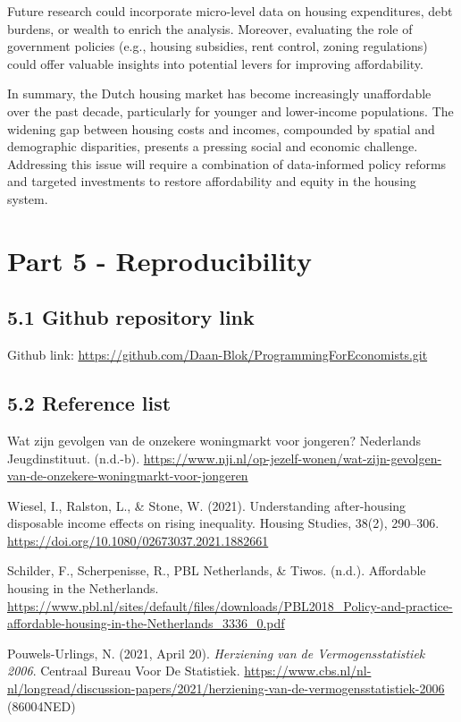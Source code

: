 \documentclass[
]{article}
\begin{document}
Future research could incorporate micro-level data on housing
expenditures, debt burdens, or wealth to enrich the analysis. Moreover,
evaluating the role of government policies (e.g., housing subsidies,
rent control, zoning regulations) could offer valuable insights into
potential levers for improving affordability.

In summary, the Dutch housing market has become increasingly
unaffordable over the past decade, particularly for younger and
lower-income populations. The widening gap between housing costs and
incomes, compounded by spatial and demographic disparities, presents a
pressing social and economic challenge. Addressing this issue will
require a combination of data-informed policy reforms and targeted
investments to restore affordability and equity in the housing system.

\section{Part 5 - Reproducibility}\label{part-5---reproducibility}

\subsection{5.1 Github repository link}\label{github-repository-link}

Github link:
\url{https://github.com/Daan-Blok/ProgrammingForEconomists.git}

\subsection{5.2 Reference list}\label{reference-list}

Wat zijn gevolgen van de onzekere woningmarkt voor jongeren? \textbar{}
Nederlands Jeugdinstituut. (n.d.-b).
\url{https://www.nji.nl/op-jezelf-wonen/wat-zijn-gevolgen-van-de-onzekere-woningmarkt-voor-jongeren}

Wiesel, I., Ralston, L., \& Stone, W. (2021). Understanding
after-housing disposable income effects on rising inequality. Housing
Studies, 38(2), 290--306.
\url{https://doi.org/10.1080/02673037.2021.1882661}

Schilder, F., Scherpenisse, R., PBL Netherlands, \& Tiwos. (n.d.).
Affordable housing in the Netherlands.
\url{https://www.pbl.nl/sites/default/files/downloads/PBL2018_Policy-and-practice-affordable-housing-in-the-Netherlands_3336_0.pdf}

Pouwels-Urlings, N. (2021, April 20). \emph{Herziening van de
Vermogensstatistiek 2006}. Centraal Bureau Voor De Statistiek.
\url{https://www.cbs.nl/nl-nl/longread/discussion-papers/2021/herziening-van-de-vermogensstatistiek-2006}
(86004NED)
\end{document}
